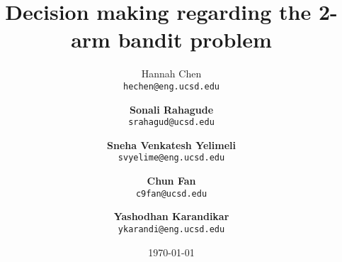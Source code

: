 \documentclass{article} %
\title{Decision making regarding the 2-arm bandit problem}
\author{Hannah Chen \\
  \texttt{hechen@eng.ucsd.edu} \and \textbf{Sonali Rahagude}\\
  \texttt{srahagud@ucsd.edu} \and \textbf{Sneha Venkatesh Yelimeli}\\
  \texttt{svyelime@eng.ucsd.edu} \and \textbf{Chun Fan}\\
  \texttt{c9fan@ucsd.edu} \and \textbf{Yashodhan Karandikar}\\
  \texttt{ykarandi@eng.ucsd.edu}}
\date{\today}
\begin{document}
\maketitle

\begin{abstract}
\end{abstract}





%




{}

\end{document}
